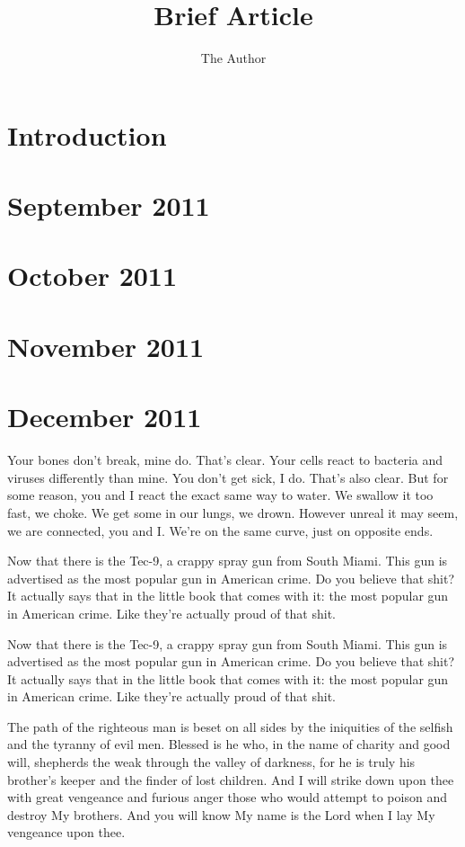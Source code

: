 \documentclass[10pt,a5paper,landscape,twoside,openright]{memoir}
\title{Brief Article}
\author{The Author}
\begin{document}
\maketitle

\chapter{Introduction}

\chapter{September 2011}

\chapter{October 2011}

\chapter{November 2011}

\chapter{December 2011}

Your bones don't break, mine do. That's clear. Your cells react to bacteria and viruses differently than mine. You don't get sick, I do. That's also clear. But for some reason, you and I react the exact same way to water. We swallow it too fast, we choke. We get some in our lungs, we drown. However unreal it may seem, we are connected, you and I. We're on the same curve, just on opposite ends.

Now that there is the Tec-9, a crappy spray gun from South Miami. This gun is advertised as the most popular gun in American crime. Do you believe that shit? It actually says that in the little book that comes with it: the most popular gun in American crime. Like they're actually proud of that shit. 

Now that there is the Tec-9, a crappy spray gun from South Miami. This gun is advertised as the most popular gun in American crime. Do you believe that shit? It actually says that in the little book that comes with it: the most popular gun in American crime. Like they're actually proud of that shit. 

The path of the righteous man is beset on all sides by the iniquities of the selfish and the tyranny of evil men. Blessed is he who, in the name of charity and good will, shepherds the weak through the valley of darkness, for he is truly his brother's keeper and the finder of lost children. And I will strike down upon thee with great vengeance and furious anger those who would attempt to poison and destroy My brothers. And you will know My name is the Lord when I lay My vengeance upon thee.
\end{document}

